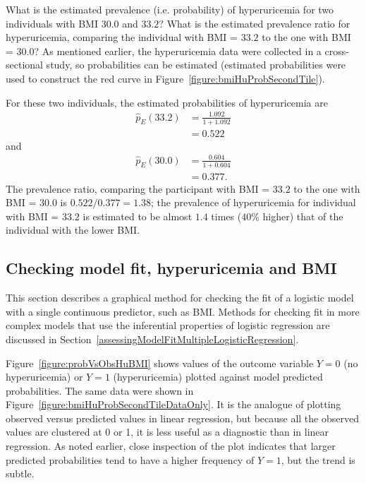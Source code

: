 \begin{examplewrap}
  \begin{nexample}{What is the estimated prevalence (i.e. probability) of hyperuricemia for two individuals with BMI $30.0$ and $33.2$? What is the estimated prevalence ratio for hyperuricemia, comparing the individual with BMI = $33.2$ to the one with BMI = $30.0$?}\label{example:RRHyperuricemia33v30}
    As mentioned earlier, the hyperuricemia data were collected in a cross-sectional study, so probabilities can be estimated (estimated probabilities were used to construct the red curve in Figure~\ref{figure:bmiHuProbSecondTile}).

    For these two individuals, the estimated probabilities of hyperuricemia are
\begin{align*}
  \hat{p}_E(33.2) &=\frac{1.092}{1 + 1.092} \\
            &= 0.522
\end{align*}
and
\begin{align*}
  \hat{p}_E(30.0) &=\frac{0.604}{1 + 0.604} \\
            &= 0.377.
\end{align*}
The prevalence ratio, comparing the participant with BMI = $33.2$ to the one with BMI = $30.0$ is $0.522/0.377 = 1.38$; the prevalence of hyperuricemia for individual with BMI = $33.2$ is estimated to be almost $1.4$ times ($40\%$ higher) that of the individual with the lower BMI.
  \end{nexample}
\end{examplewrap}

\subsection{Checking model fit, hyperuricemia and BMI}
\label{assessingFitHyperuricemiaBMI}

This section describes a graphical method for checking the fit of a logistic model with a single continuous predictor, such as BMI.   Methods for checking fit in more complex models that use the inferential properties of logistic regression are discussed in Section~\ref{assessingModelFitMultipleLogisticRegression}.

Figure~\ref{figure:probVsObsHuBMI} shows values of the outcome variable $Y = 0$ (no hyperuricemia) or $Y = 1$ (hyperuricemia) plotted against model predicted probabilities. The same data were shown in Figure~\ref{figure:bmiHuProbSecondTileDataOnly}. It is the analogue of plotting observed versus predicted values in linear regression, but because all the observed values are clustered at 0 or 1, it is less useful as a diagnostic than in linear regression.  As noted earlier, close inspection of the plot indicates that larger predicted probabilities tend to have a higher frequency of $Y = 1$, but the trend is subtle.

